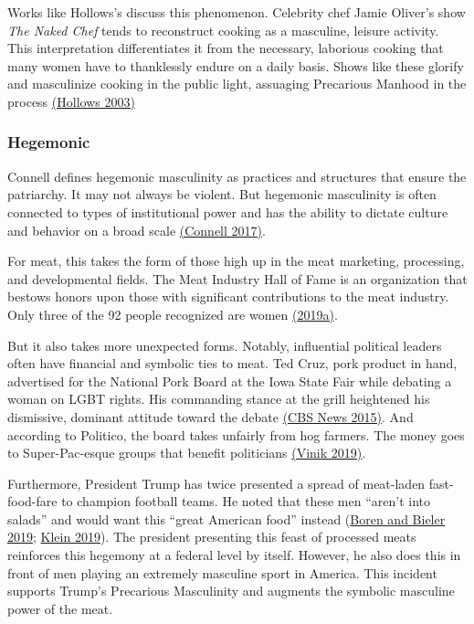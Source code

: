 \documentclass[twoside]{report}
\begin{document}
\begin{multicols}{2}
Works like Hollows's discuss this phenomenon. Celebrity chef Jamie Oliver's show \emph{The Naked Chef} tends to reconstruct cooking as a masculine, leisure activity. This interpretation differentiates it from the necessary, laborious cooking that many women have to thanklessly endure on a daily basis. Shows like these glorify and masculinize cooking in the public light, assuaging Precarious Manhood in the process \hyperlink{hollows}{(Hollows 2003)}

\subsubsection{Hegemonic}

Connell defines hegemonic masculinity as practices and structures that
ensure the patriarchy. It may not always be violent. But hegemonic
masculinity is often connected to types of institutional power and has
the ability to dictate culture and behavior on a broad scale \hyperlink{connell}{(Connell 2017)}.

For meat, this takes the form of those high up in the meat marketing,
processing, and developmental fields. The Meat Industry Hall of Fame is an
organization that bestows honors upon those with significant
contributions to the meat industry. Only three of the 92 people
recognized are women \hyperlink{2019a}{(2019a)}.

But it also takes more unexpected forms. Notably, influential political
leaders often have financial and symbolic ties to meat. Ted Cruz, pork
product in hand, advertised for the National Pork Board at the Iowa
State Fair while debating a woman on LGBT rights. His commanding stance
at the grill heightened his dismissive, dominant attitude toward the
debate \hyperlink{cbs}{(CBS News 2015)}. And according to Politico, the board takes unfairly from hog farmers. The money goes to Super-Pac-esque groups that
benefit politicians \hyperlink{vinik}{(Vinik 2019)}.

Furthermore, President Trump has twice presented a spread of meat-laden
fast-food-fare to champion football teams. He noted that these men
``aren't into salads'' and would want this ``great American food''
instead (\hyperlink{boren}{Boren and Bieler 2019}; \hyperlink{klein}{Klein 2019}). The president presenting this feast of processed meats reinforces this hegemony at a federal level by itself. However, he also does this in front of men playing an extremely masculine sport in America. This incident supports Trump's Precarious Masculinity and augments the symbolic masculine power of the meat.


\end{multicols}
\end{document}
